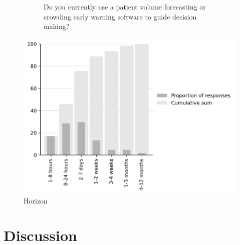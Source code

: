 \documentclass{article}
\begin{document}
\begin{figure}[H]
\begin{subfigure}[b]{0.45\textwidth}
        \caption{Do you currently use a patient volume forecasting or crowding early warning software to guide decision making?}
        \label{fig:software_usage}
    \end{subfigure}
    \caption{}
    \label{fig:software_usage}
\end{figure}

\begin{figure}[H]
    \centering
        \includegraphics[width=1.0\textwidth]{../output/plots/horizon}
        \caption{Horizon}
        \label{fig:horizon}
\end{figure}

\section{Discussion}
\lipsum[1-8]
\end{document}
